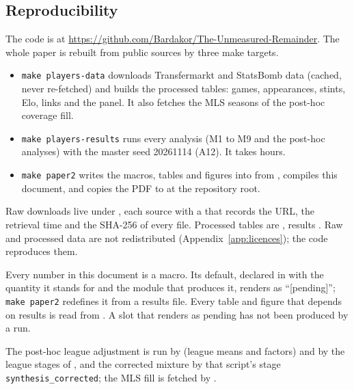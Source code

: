\documentclass[11pt,a4paper]{article}
\begin{document}
\clearpage
\begin{appendices}

\section{Reproducibility}
\label{app:repro}

The code is at \url{https://github.com/Bardakor/The-Unmeasured-Remainder}.
The whole paper is rebuilt from public sources by three make targets.

\begin{itemize}
  \item \texttt{make players-data} downloads Transfermarkt and StatsBomb data
    (cached, never re-fetched) and builds the processed tables: games,
    appearances, stints, Elo, links and the panel. It also fetches the MLS
    seasons of the post-hoc coverage fill.
  \item \texttt{make players-results} runs every analysis (M1 to M9 and the
    post-hoc analyses) with the master seed 20261114 (A12). It takes hours.
  \item \texttt{make paper2} writes the macros, tables and figures into
     from , compiles
    this document, and copies the PDF to
     at the repository root.
\end{itemize}

Raw downloads live under , each source with a
 that records the URL, the retrieval time and the SHA-256
of every file. Processed tables are ,
results . Raw and processed data are not
redistributed (Appendix~\ref{app:licences}); the code reproduces them.

Every number in this document is a macro. Its default, declared in
 with the quantity it stands for
and the module that produces it, renders as ``[pending]''; \texttt{make paper2}
redefines it from a results file. Every table and figure that depends on
results is read from . A slot that renders as pending has
not been produced by a run.

The post-hoc league adjustment is run by
 (league means and factors) and by the
league stages of , and the corrected
mixture by that script's stage \texttt{synthesis\_corrected}; the MLS fill is
fetched by .


\end{appendices}
\end{document}

